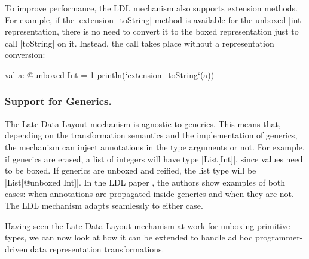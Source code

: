 To improve performance, the LDL mechanism also supports extension methods. For example, if the |extension_toString| method is available for the unboxed |int| representation, there is no need to convert it to the boxed representation just to call |toString| on it. Instead, the call takes place without a representation conversion:

\begin{lstlisting-nobreak}
val a: @unboxed Int = 1
println(`extension_toString`(a))
\end{lstlisting-nobreak}

\subsubsection{Support for Generics.} The Late Data Layout mechanism
is agnostic to generics. This means that, depending on the
transformation semantics and the implementation of generics, the
mechanism can inject annotations in the type arguments or not. For
example, if generics are erased, a list of integers will have type
|List[Int]|, since values need to be boxed. If generics are unboxed
and reified, the list type will be |List[@unboxed Int]|. In the LDL
paper \cite{ldl}, the authors show examples of both cases: when
annotations are propagated inside generics and when they are not. The
LDL mechanism adapts seamlessly to either case.

Having seen the Late Data Layout mechanism at work for unboxing primitive types, we can now look at how it can be extended to handle ad hoc programmer-driven data representation transformations.
